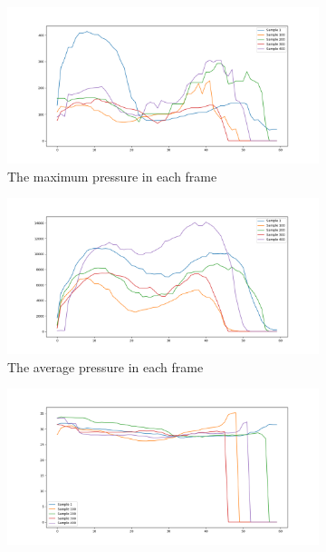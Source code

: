 \begin{figure}
     \centering
     \begin{subfigure}[b]{0.5\textwidth}
         \centering
         \includegraphics[width=\textwidth]{figures/project/df_max.png}
         \caption{The maximum pressure in each frame}
         \label{fig:extracted_features_max}
     \end{subfigure}
     \hfill
     \begin{subfigure}[b]{0.5\textwidth}
         \centering
         \includegraphics[width=\textwidth]{figures/project/df_sum.png}
         \caption{The average pressure in each frame}
         \label{fig:extracted_features_sum}
     \end{subfigure}
     \vfill
     \begin{subfigure}[b]{0.5\textwidth}
         \centering
         \includegraphics[width=\textwidth]{figures/project/df_xCe.png}

\end{subfigure}
\end{figure}
